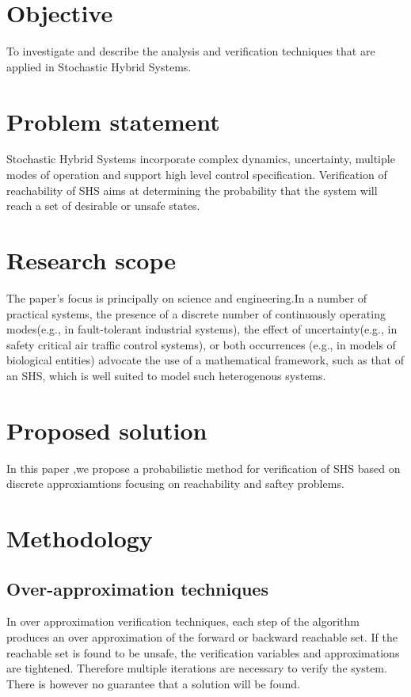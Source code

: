 \documentclass{article}
\begin{document}
\section{Objective}
To investigate and describe the analysis and verification techniques that are applied in Stochastic Hybrid Systems.

\section{Problem statement}
Stochastic Hybrid Systems incorporate complex dynamics, uncertainty, multiple modes of operation and support high level control specification. Verification of reachability of SHS aims at determining the probability that the system will reach a set of desirable or unsafe states.

\section{Research scope}
The paper's focus is principally on science and engineering.\cite{SHS2}In a number of practical systems, the presence of a discrete number of continuously operating modes(e.g., in fault-tolerant industrial systems), the effect of uncertainty(e.g., in safety critical air traffic control systems), or both occurrences (e.g., in models of biological entities) advocate the use of a mathematical framework, such as that of an SHS, which is well suited to model such heterogenous systems. 

\section{Proposed solution}
In this paper ,we propose a probabilistic method for verification of SHS based on discrete approxiamtions focusing on reachability and saftey problems.

\section{Methodology}
\subsection{Over-approximation techniques}
In over approximation verification techniques, each step of the algorithm produces an over approximation of the forward or backward reachable set. If the reachable set is found to be unsafe, the verification variables and approximations are tightened. Therefore multiple iterations are necessary to verify the system. There is however no guarantee that a solution will be found.
\end{document}
